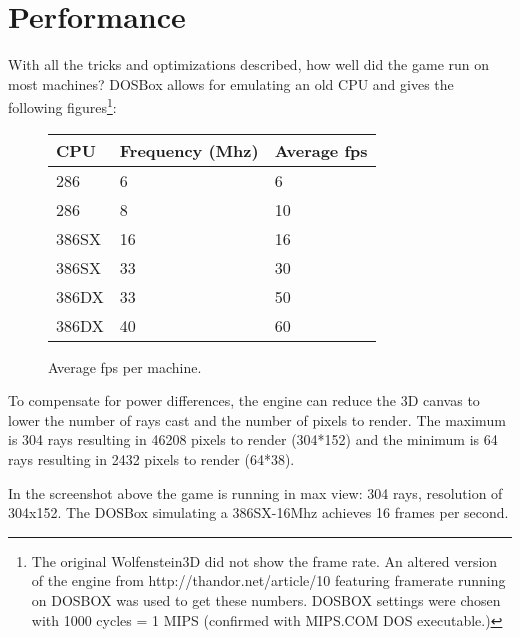 \section{Performance}
With all the tricks and optimizations described, how well did the game run on most machines? DOSBox allows for emulating an old CPU and gives the following figures\footnote{The original Wolfenstein3D did not show the frame rate. An altered version of the engine from http://thandor.net/article/10 featuring framerate running on DOSBOX was used to get these numbers. DOSBOX settings were chosen with 1000 cycles = 1 MIPS (confirmed with MIPS.COM DOS executable.)}:

\begin{figure}[H]
\centering
\begin{tabularx}{\textwidth}{ X X X }
  \toprule
  \textbf{CPU} & \textbf{Frequency (Mhz)} & \textbf{Average fps} \\ \bottomrule
 286 & 6 & 6 \\
 286 & 8 & 10 \\
 386SX & 16 &  16 \\
 386SX & 33 & 30 \\
 386DX & 33 & 50 \\
 386DX & 40 & 60 \\ \bottomrule
\end{tabularx}
\caption{Average fps per machine.}
\end{figure}

To compensate for power differences, the engine can reduce the 3D canvas to lower the number of rays cast and the number of pixels to render. The maximum is 304 rays resulting in 46208 pixels to render (304*152) and the minimum is 64 rays resulting in 2432 pixels to render (64*38).\\

  \begin{figure}[H]
\centering
 \end{figure}
 \par
 In the screenshot above the game is running in max view: 304 rays, resolution of 304x152. The DOSBox simulating a 386SX-16Mhz achieves 16 frames per second.

   \begin{figure}[H]
\centering
 \end{figure}
 \par

